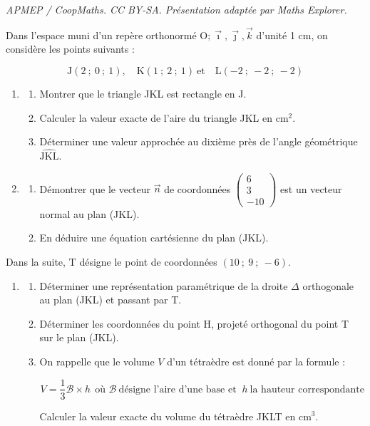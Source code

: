 \documentclass[10pt]{article}
\providecommand{\vect}[1]{\overrightarrow{#1}}
\providecommand{\Oijk}{\(\mathrm{O};\vec{\imath},\vec{\jmath},\vec{k}\)}
\begin{document}
\noindent\textit{APMEP / CoopMaths. CC BY-SA. Présentation adaptée par Maths Explorer.}\par\medskip
\medskip

Dans l'espace muni d'un repère orthonormé \Oijk{} d'unité 1 cm, on considère les points suivants :

\[\text{J}(2~;~0~;~1), \quad \text{K}( 1~;~2~;~1)\:\text{et} \quad \text{L}(-2~;~-2~;~-2)\]

\begin{enumerate}
\item 
	\begin{enumerate}
		\item Montrer que le triangle JKL est rectangle en J.
		\item Calculer la valeur exacte de l'aire du triangle JKL en cm$^2$.
		\item Déterminer une valeur approchée au dixième près de l'angle géométrique $\widehat{\text{JKL}}$.
	\end{enumerate}
		
\item
	\begin{enumerate}
		\item Démontrer que le vecteur $\vect{n}$ de coordonnées $\begin{pmatrix}6\\3\\-10\end{pmatrix}$ est un vecteur normal au plan (JKL).
		\item En déduire une équation cartésienne du plan (JKL).
	\end{enumerate}
\end{enumerate}

Dans la suite, T désigne le point de coordonnées $(10~;~9~;~-6)$.

\begin{enumerate}[resume]
\item
	\begin{enumerate}
		\item Déterminer une représentation paramétrique de la droite $\Delta$
orthogonale au plan (JKL) et passant par T.
		\item Déterminer les coordonnées du point H, projeté orthogonal du point T sur le plan (JKL).
		\item On rappelle que le volume $V$ d'un tétraèdre est donné par la formule :
		
		\[V  = \dfrac13 \mathcal{B} \times h\:\: \text{où }  \mathcal{B}\:\text{désigne l'aire d'une base et } \: h \: \text{la hauteur correspondante}\]
		
Calculer la valeur exacte du volume du tétraèdre JKLT en cm$^3$.
	\end{enumerate}
\end{enumerate}

\bigskip
\end{document}
